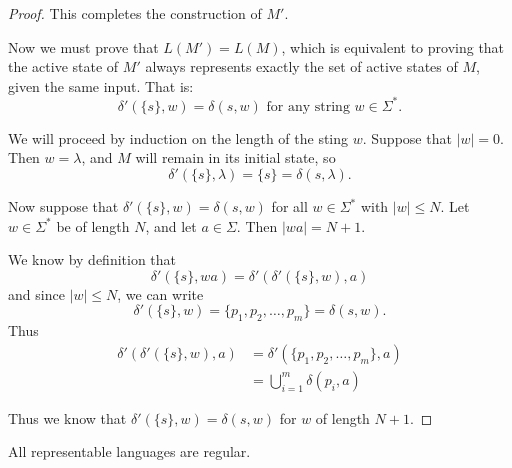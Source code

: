 \documentclass{bcthesis}
\begin{document}
\begin{proof}
		This completes the construction of $M'$.

		Now we must prove that $L(M') = L(M)$, which is equivalent to proving that the active state of $M'$ always represents exactly the set of active states of $M$, given the same input.
		That is:
		\[
			\delta'(\{ s \}, w) = \delta(s, w) \text{ for any string } w \in \Sigma^*.
		\]
		
		We will proceed by induction on the length of the sting $w$.
		Suppose that $|w| = 0$.
		Then $w = \lambda$, and $M$ will remain in its initial state, so 
		\[
			\delta'(\{ s \}, \lambda) = \{ s \} = \delta(s, \lambda).
		\]

		Now suppose that $\delta'(\{ s \}, w) = \delta(s, w)$ for all $w \in \Sigma^*$ with $|w| \leq N$.
		Let $w \in \Sigma^*$ be of length $N$, and let $a \in \Sigma$. 
		Then $|wa| = N + 1$.
		
		We know by definition that 
		\[
			\delta'(\{ s\}, wa) = \delta'( \delta'(\{ s\}, w), a )
		\]
		and since $|w| \leq N$, we can write 
		\[
			\delta'(\{ s \}, w) = \{ p_1, p_2, \dots, p_m \} = \delta(s, w).
		\]
		Thus
		\begin{align*}
			\delta'( \delta'(\{ s \}, w), a ) &= \delta'(\{ p_1, p_2, \dots, p_m \}, a) \\
			&= \bigcup_{i=1}^m \delta(p_i, a)
		\end{align*}

		Thus we know that $\delta'(\{ s \}, w) = \delta(s, w)$ for $w$ of length $N+1$.

	\end{proof}

	\begin{claim}
	\label{prop:representable_languages_regular}
		All representable languages are regular.
	\end{claim}
\end{document}
